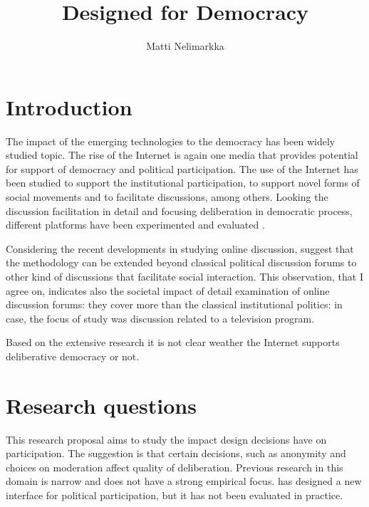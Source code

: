 \documentclass[journal,a4paper]{IEEEtran}
\author{Matti Nelimarkka}
\title{Designed for Democracy}
\begin{document}
\maketitle

\setlength{\parindent}{0pt}
\setlength{\parskip}{1ex}


\section{Introduction}

The impact of the emerging technologies to the democracy has been widely studied topic. The rise of the Internet is again one media that provides potential for support of democracy and political participation. The use of the Internet has been studied to support the institutional participation, to support novel forms of social movements and to facilitate discussions, among others. Looking the discussion facilitation in detail and focusing deliberation in democratic process, different platforms have been experimented  and evaluated .

Considering the recent developments in studying online discussion,  suggest that the methodology can be extended beyond classical political discussion forums to other kind of discussions that facilitate social interaction. This observation, that I agree on, indicates also the societal impact of detail examination of online discussion forums: they cover more than the classical institutional politics: in  case, the focus of study was discussion related to a television program.

Based on the extensive research it is not clear weather the Internet supports deliberative democracy or not.

\section{Research questions}

This research proposal aims to study the impact design decisions have on participation. The suggestion is that certain decisions, such as anonymity and choices on moderation affect quality of deliberation. Previous research in this domain is narrow and does not have a strong empirical focus.  has designed a new interface for political participation, but it has not been evaluated in practice. 
\end{document}
